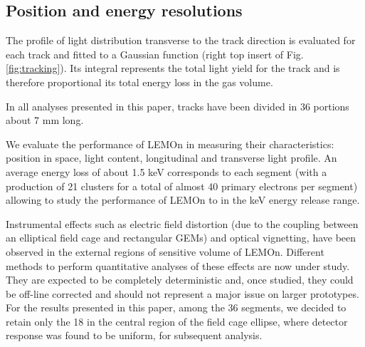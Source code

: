 \documentclass[review]{elsarticle}
\begin{document}
\subsection{Position and energy resolutions}

 The profile of light distribution transverse to the track direction is evaluated for each track and fitted to a Gaussian function (right top insert of Fig. \ref{fig:tracking}).
 Its integral represents the total light yield for the track and is therefore proportional its total energy loss in the gas volume. 

 In all analyses presented in this paper, tracks have been divided in 36 portions about 7 mm long. 
 
 We evaluate the performance of LEMOn in measuring their characteristics: position in space, light content, longitudinal and transverse light profile. 
 An average energy loss of about 1.5 keV corresponds to each segment (with a production of 21 clusters for a total of almost 40 primary electrons per segment) allowing to study the performance of LEMOn to in the keV energy release range.
 
   Instrumental effects such as electric field distortion (due to the coupling between an elliptical field cage and rectangular GEMs) and optical vignetting, have been observed in the external regions of sensitive volume of LEMOn.
  Different methods to perform quantitative analyses of these effects are now under study. They are expected to be completely deterministic and, once studied, they could be off-line corrected and should not represent a major issue on larger prototypes.
  For the results presented in this paper, among the 36 segments, we decided to retain only the 18 in the central region of the field cage  ellipse, where detector response was found to be uniform, for subsequent analysis. 
  
\end{document}
